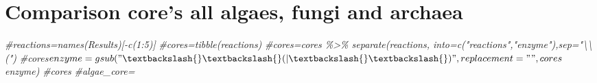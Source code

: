 \documentclass[
  letterpaper,
  DIV=11,
  numbers=noendperiod]{scrreprt}
\newenvironment{Shaded}{}{}
\newcommand{\CommentTok}[1]{\textcolor[rgb]{0.36,0.39,0.44}{\textit{#1}}}
\newcommand{\FunctionTok}[1]{\textcolor[rgb]{0.38,0.69,0.94}{#1}}
\newcommand{\NormalTok}[1]{\textcolor[rgb]{0.67,0.70,0.75}{#1}}
\newcommand{\OtherTok}[1]{\textcolor[rgb]{0.15,0.68,0.38}{#1}}
\newcommand{\SpecialCharTok}[1]{\textcolor[rgb]{0.34,0.71,0.76}{#1}}
\begin{document}
\hypertarget{comparison-cores-all-algaes-fungi-and-archaea}{%
\section{Comparison core's all algaes, fungi and
archaea}\label{comparison-cores-all-algaes-fungi-and-archaea}}

\begin{Shaded}
\begin{Highlighting}[]
\CommentTok{\#reactions=names(Results)[{-}c(1:5)]}
\CommentTok{\#cores=tibble(reactions)}
\CommentTok{\#cores=cores \%\textgreater{}\%  separate(reactions, into=c("reactions","enzyme"),sep="\textbackslash{}\textbackslash{}(")}
\CommentTok{\#cores$enzyme=gsub("\textbackslash{}\textbackslash{}(|\textbackslash{}\textbackslash{})",replacement = "",cores$enzyme)}
\CommentTok{\#cores}
\CommentTok{\#algae\_core=}
\end{Highlighting}
\end{Shaded}

\begin{Shaded}
\end{Shaded}
\end{document}

